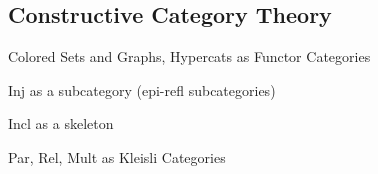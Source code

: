 



\subsection{Constructive Category Theory}

Colored Sets and Graphs, Hypercats as Functor Categories

Inj as a subcategory (epi-refl subcategories)

Incl as a skeleton

Par, Rel, Mult as Kleisli Categories

